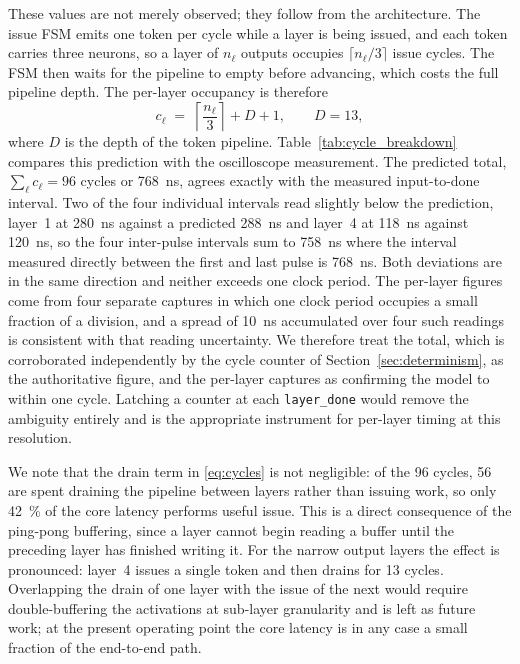 \documentclass[final,5p,times,twocolumn]{elsarticle}
\begin{document}
These values are not merely observed; they follow from the architecture. The
issue FSM emits one token per cycle while a layer is being issued, and each
token carries three neurons, so a layer of $n_\ell$ outputs occupies
$\lceil n_\ell/3 \rceil$ issue cycles. The FSM then waits for the pipeline to
empty before advancing, which costs the full pipeline depth. The per-layer
occupancy is therefore
%
\begin{equation}
c_\ell \;=\; \left\lceil \frac{n_\ell}{3} \right\rceil + D + 1,
\qquad D = 13,
\label{eq:cycles}
\end{equation}
%
where $D$ is the depth of the token pipeline. Table~\ref{tab:cycle_breakdown}
compares this prediction with the oscilloscope measurement. The predicted total,
$\sum_\ell c_\ell = 96$ cycles or \SI{768}{\nano\second}, agrees exactly with
the measured input-to-done interval. Two of the four individual intervals read
slightly below the prediction, layer~1 at \SI{280}{\nano\second} against a
predicted \SI{288}{\nano\second} and layer~4 at \SI{118}{\nano\second} against
\SI{120}{\nano\second}, so the four inter-pulse intervals sum to
\SI{758}{\nano\second} where the interval measured directly between the first
and last pulse is \SI{768}{\nano\second}. Both deviations are in the same
direction and neither exceeds one clock period. The per-layer figures come from
four separate captures in which one clock period occupies a small fraction of a
division, and a spread of \SI{10}{\nano\second} accumulated over four such
readings is consistent with that reading uncertainty. We therefore treat the
total, which is corroborated independently by the cycle counter of
Section~\ref{sec:determinism}, as the authoritative figure, and the per-layer
captures as confirming the model to within one cycle. Latching a counter at
each \texttt{layer\_done} would remove the ambiguity entirely and is the
appropriate instrument for per-layer timing at this resolution.

We note that the drain term in \eqref{eq:cycles} is not negligible: of the 96
cycles, 56 are spent draining the pipeline between layers rather than issuing
work, so only \SI{42}{\percent} of the core latency performs useful issue. This is a direct consequence of the ping-pong buffering, since a layer
cannot begin reading a buffer until the preceding layer has finished writing it.
For the narrow output layers the effect is pronounced: layer~4 issues a
single token and then drains for 13 cycles. Overlapping the drain of one layer
with the issue of the next would require double-buffering the activations at
sub-layer granularity and is left as future work; at the present operating point
the core latency is in any case a small fraction of the end-to-end path.
\end{document}
